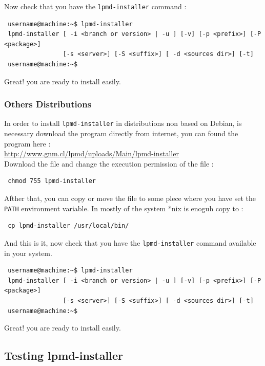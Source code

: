 Now check that you have the \verb|lpmd-installer| command :
\begin{verbatim}
 username@machine:~$ lpmd-installer 
 lpmd-installer [ -i <branch or version> | -u ] [-v] [-p <prefix>] [-P <package>] 
                [-s <server>] [-S <suffix>] [ -d <sources dir>] [-t]
 username@machine:~$
\end{verbatim}

Great! you are ready to install {\lpmd} easily.

\subsubsection{Others Distributions}

In order to install \verb|lpmd-installer| in distributions non based on Debian,
is necessary download the program directly from internet, you can found the
program here :\\

\url{http://www.gnm.cl/lpmd/uploads/Main/lpmd-installer}\\

Download the file and change the execution permission of the file :

\begin{verbatim}
 chmod 755 lpmd-installer
\end{verbatim}

Afther that, you can copy or move the file to some plece where you have set the
\verb|PATH| environment variable. In mostly of the system *nix is enoguh copy to
:

\begin{verbatim}
 cp lpmd-installer /usr/local/bin/
\end{verbatim}

And this is it, now check that you have the \verb|lpmd-installer| command
available in your system.
\begin{verbatim}
 username@machine:~$ lpmd-installer 
 lpmd-installer [ -i <branch or version> | -u ] [-v] [-p <prefix>] [-P <package>] 
                [-s <server>] [-S <suffix>] [ -d <sources dir>] [-t]
 username@machine:~$
\end{verbatim}

Great! you are ready to install {\lpmd} easily.

\subsection{Testing lpmd-installer}

